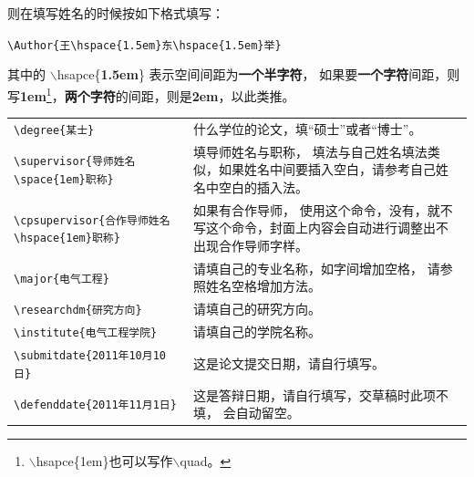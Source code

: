则在填写姓名的时候按如下格式填写：

{\noindent{}
\verb+\Author{王\hspace{1.5em}东\hspace{1.5em}举}+}

其中的 $\backslash$hsapce\{{\bf1.5em}\} 表示空间间距为{\bfseries 一个半字符}，
如果要{\bfseries 一个字符}间距，则写{\bf 1em}\footnote{$\backslash$hsapce\{1em\}也可以写作$\backslash$quad。}，{\bfseries 两个字符}的间距，则是{\bf 2em}，以此类推。

\vspace{8pt}

{\linespread{1}
\noindent
\begin{tabular}{p{8cm}p{7cm}}
\verb+\degree{某士}+
&
什么学位的论文，填“硕士”或者“博士”。\\

\verb+\supervisor{导师姓名\space{1em}职称}+
&
填导师姓名与职称，
填法与自己姓名填法类似，如果姓名中间要插入空白，请参考自己姓名中空白的插入法。\\

\verb+\cpsupervisor{合作导师姓名\hspace{1em}职称}+
&
如果有合作导师，
使用这个命令，没有，就不写这个命令，封面上内容会自动进行调整出不出现合作导师字样。\\

\verb+\major{电气工程}+
&
请填自己的专业名称，如字间增加空格，
请参照姓名空格增加方法。\\

\verb+\researchdm{研究方向}+
&
请填自己的研究方向。\\

\verb+\institute{电气工程学院}+
&
请填自己的学院名称。\\

\verb+\submitdate{2011年10月10日}+
&
这是论文提交日期，请自行填写。\\

\verb+\defenddate{2011年11月1日}+
&
这是答辩日期，请自行填写，交草稿时此项不填，
会自动留空。\\
\end{tabular}
}

